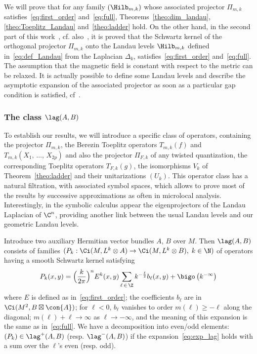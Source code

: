We will prove that for any family $(\Hilb_{m,k})$ whose associated projector $\Pi_{m,k}$ satisfies~\eqref{eq:first_order} and~\eqref{eq:full}, Theorems~\ref{theo:dim_landau}, \ref{theo:Toeplitz_Landau} and~\ref{theo:ladder} hold. On the other hand, in the second part of this work~\cite{oim_copain}, cf. also~\cite{Yuri_1}, it is proved that the Schwartz kernel of the orthogonal projector $\Pi_{m,k}$ onto the Landau levels $\Hilb_{m,k}$ defined in~\eqref{eq:def_Landau} from the Laplacian $\Delta_k$, satisfies~\eqref{eq:first_order} and~\eqref{eq:full}. The assumption that the magnetic field is constant with respect to the metric can be relaxed. It is actually possible to define some Landau levels and describe the asymptotic expansion of the associated projector as soon as a particular gap condition is satisfied, cf~\cite{oim_copain}.

\break
\subsubsection{The class $\lag (A,B)$}
To establish our results, we will introduce a specific class of operators, containing the projector $\Pi_{m,k}$, the Berezin Toeplitz operators $T_{m,k} (f)$ and $T_{m,k} (X_1,\,\ldots,\,X_{2p})$ and also the projector $\Pi_{F,k}$ of any twisted quantization, the corresponding Toeplitz operators $T_{F,k} (g)$, the isomorphisms $V_k$ of Theorem~\ref{theo:ladder} and their unitarizations $(U_k)$. This operator class has a natural filtration, with associated symbol spaces, which allows to prove most of the results by successive approximations as often in microlocal analysis. Interestingly, in the symbolic calculus appear the eigenprojectors of  the Landau Laplacian of $\C^n$, providing another link between the usual Landau levels and our geometric Landau levels. 

Introduce two auxiliary Hermitian vector bundles $A$, $B$ over $ M$. Then $\lag (A,B)$ consists of families $(P_k : \Ci(M, L^k \otimes A) \rightarrow \Ci(M, L^k \otimes B), \; k \in \N)$ of operators having a smooth Schwartz kernel satisfying
\begin{gather}\label{eq:exp_lag}
P_k (x,y) = \Bigl(\frac{k}{2\pi} \Bigr)^n E^{k}(x,y) \sum_{\ell\, \in\,\Z } k^{-\frac{\ell}{2}} b_{\ell}(x,y) + \bigo \left(k^{- \infty}\right)
\end{gather}
where $E$ is defined as in~\eqref{eq:first_order}; the coefficients $b_{\ell} $ are in $\Ci (M^2, B \boxtimes \con{A})$; for $\ell <0$, $b_{\ell}$ vanishes to order $m (\ell)
\geqslant -\ell $ along the diagonal; $m(\ell) + \ell \rightarrow \infty $ as $\ell
\rightarrow - \infty$, and the meaning of this expansion is the same as in~\eqref{eq:full}. We have a decomposition into even/odd elements: $(P_k) \in \lag^{+} (A,B)$ (resp. $\lag^{-} (A,B)$) if the expansion~\eqref{eq:exp_lag} holds with a sum over the $\ell$'s even (resp. odd).

